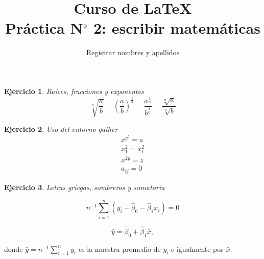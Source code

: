 \documentclass[12pt,a4paper]{article}
\author{Registrar nombres y apellidos}
\title{Curso de \LaTeX{}\\{\normalsize Práctica N$^{\circ}$ 2: escribir matemáticas}}
\date{}
\newtheorem{ejer}{Ejercicio}
\begin{document}
\maketitle

\begin{ejer}
Raíces, fracciones y exponentes
\begin{displaymath}
\sqrt[n]{\frac{a}{b}}= \left(\frac{a}{b}\right)^{\frac{1}{n}}=\frac{a^{\frac{1}{n}}}{b^{\frac{1}{n}}}=\frac{\sqrt[n]{a}}{\sqrt[n]{b}}
\end{displaymath}
\end{ejer}

\begin{ejer}
Uso del entorno gather
\begin{gather}
x^{y^{z}}=a\\
x^{2}_{1}=x^{2}_{1}\\
x^{2y}=z\\
a_{ij}=0
\end{gather}
\end{ejer}

\begin{ejer}
Letras griegas, sombreros y sumatoria

\begin{displaymath}
n^{-1}\sum^{n}_{i=1}(y_{i}- \hat{\beta}_{0}-\hat{\beta}_{1}x_{i})=0
\end{displaymath}

\begin{displaymath}
\bar{y}=\hat{\beta}_{0}+\hat{\beta}_{1}\bar{x},
\end{displaymath}
\end{ejer}
donde $\bar{y}=n^{-1}\sum^{n}_{i=1}y_{i}$ es la muestra promedio de $y_{i}$ e igualmente por $\bar{x}$. 
\end{document}
